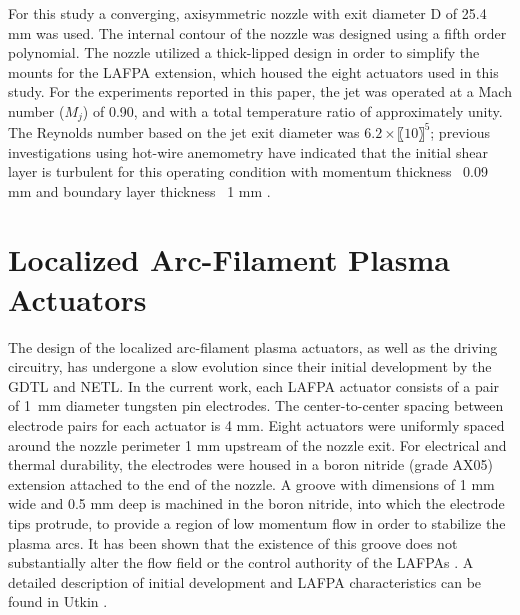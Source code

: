 For this study a converging, axisymmetric nozzle with exit diameter D of 25.4 mm was used. 
The internal contour of the nozzle was designed using a fifth order polynomial. 
The nozzle utilized a thick-lipped design in order to simplify the mounts for the LAFPA extension, which housed the eight actuators used in this study. 
For the experiments reported in this paper, the jet was operated at a Mach number ($M_j$) of 0.90, and with a total temperature ratio of approximately unity. 
The Reynolds number based on the jet exit diameter was $6.2\times〖10〗^5$; previous investigations using hot-wire anemometry have indicated that the initial shear layer is turbulent for this operating condition with momentum thickness ~0.09 mm and boundary layer thickness ~1 mm \citep{Kearney-Fischer2009}.

\section{Localized Arc-Filament Plasma Actuators}
The design of the localized arc-filament plasma actuators, as well as the driving circuitry, has undergone a slow evolution since their initial development by the GDTL and NETL.
In the current work, each LAFPA actuator consists of a pair of 1~mm diameter tungsten pin electrodes.
The center-to-center spacing between electrode pairs for each actuator is 4 mm.
Eight actuators were uniformly spaced around the nozzle perimeter 1 mm upstream of the nozzle exit. 
For electrical and thermal durability, the electrodes were housed in a boron nitride (grade AX05) extension attached to the end of the nozzle. 
A groove with dimensions of 1 mm wide and 0.5 mm deep is machined in the boron nitride, into which the electrode tips protrude, to provide a region of low momentum flow in order to stabilize the plasma arcs. 
It has been shown that the existence of this groove does not substantially alter the flow field or the control authority of the LAFPAs \citep{Hahn2011a}. 
A detailed description of initial development and LAFPA characteristics can be found in Utkin \etal \citep{Utkin2007}.

